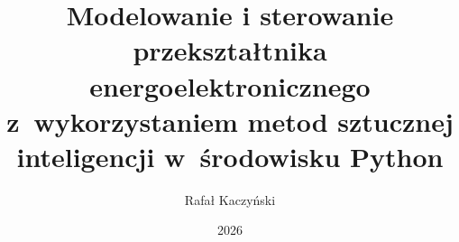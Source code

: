 \documentclass[thesis=mgr,faculty=ee]{EE-dyplom}
\title{Modelowanie i sterowanie przekształtnika energoelektronicznego z~wykorzystaniem metod sztucznej inteligencji w~środowisku Python}
\author{Rafał Kaczyński}
\date{2026}
\begin{document}
    \frontpages
    

	
	
	
	
	
	

    \bibliografia

    
    \acronymslist
    \listoffigures
    \listoftables
    \easyappendices
\end{document}
